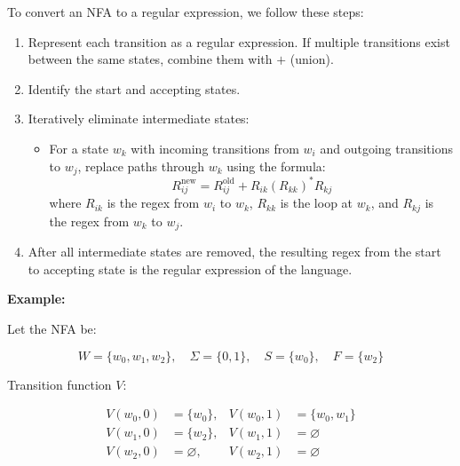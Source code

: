 \documentclass[12pt,a4paper,openany]{article}
\begin{document}
To convert an NFA to a regular expression, we follow these steps:

\begin{enumerate}
    \item Represent each transition as a regular expression. If multiple transitions exist between the same states, combine them with $+$ (union).
    \item Identify the start and accepting states.
    \item Iteratively eliminate intermediate states:
    \begin{itemize}
        \item For a state $w_k$ with incoming transitions from $w_i$ and outgoing transitions to $w_j$, replace paths through $w_k$ using the formula:
        \[
        R_{ij}^{\text{new}} = R_{ij}^{\text{old}} + R_{ik} (R_{kk})^* R_{kj}
        \]
        where $R_{ik}$ is the regex from $w_i$ to $w_k$, $R_{kk}$ is the loop at $w_k$, and $R_{kj}$ is the regex from $w_k$ to $w_j$.
    \end{itemize}
    \item After all intermediate states are removed, the resulting regex from the start to accepting state is the regular expression of the language.
\end{enumerate}

\textbf{Example:}

Let the NFA be:

\[
W = \{w_0, w_1, w_2\}, \quad
\Sigma = \{0,1\}, \quad
S = \{w_0\}, \quad
F = \{w_2\}
\]

Transition function $V$:

\[
\begin{aligned}
V(w_0,0) &= \{w_0\}, & V(w_0,1) &= \{w_0, w_1\} \\
V(w_1,0) &= \{w_2\}, & V(w_1,1) &= \varnothing \\
V(w_2,0) &= \varnothing, & V(w_2,1) &= \varnothing
\end{aligned}
\]

\begin{center}
\end{center}
\end{document}
